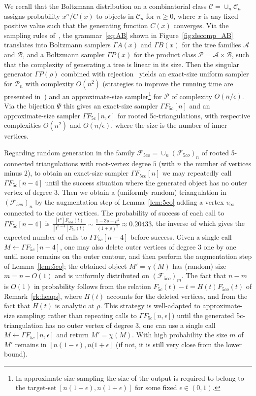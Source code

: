 \documentclass[letter]{amsart}
\numberwithin{theo}{section}
\theoremstyle{remark}
\def\cA{\mathcal{A}}
\def\cB{\mathcal{B}}
\def\cC{\mathcal{C}}
\def\cP{\mathcal{P}}
\def\cF{\mathcal{F}}
\def\Ffc{F_{5c}}
\def\Ffco{F_{5co}}
\def\cFco{\cF_{5co}}
\begin{document}
We recall that the Boltzmann distribution on a combinatorial class $\cC=\cup_n\cC_n$ assigns probability $x^n/C(x)$ to objects in $\cC_n$ for $n\geq 0$, where $x$ is any fixed positive value such that the generating function $C(x)$ converges. 
Via the sampling rules of~\cite{DuchonFLS04},
 the grammar~\eqref{eq:AB} shown in Figure~\ref{fig:decomp_AB} translates into 
Boltzmann samplers $\Gamma A(x)$ and $\Gamma B(x)$ for the tree families $\cA$ and $\cB$, and a Boltzmann sampler $\Gamma P(x)$ for the product class $\cP=\cA\times\cB$, such that the complexity of generating a tree is linear in its size. 
Then the singular generator $\Gamma P(\rho)$ combined with rejection~\cite[Sec.7.2]{DuchonFLS04} yields an exact-size uniform sampler for $\cP_n$ with complexity $O(n^2)$ (strategies to improve the running time are presented in~\cite{Spo21}) and an approximate-size sampler\footnote{In approximate-size sampling the size of the output is required to belong to the target-set $[n(1-\epsilon),n(1+\epsilon)]$ for some fixed $\epsilon\in(0,1)$.} for $\cP$  of complexity $O(n/\epsilon)$. 
Via the bijection $\Psi$ this gives an exact-size sampler $\Gamma F_{5c}[n]$ and an  approximate-size sampler $\Gamma F_{5c}[n,\epsilon]$ for rooted 5c-triangulations, 
with respective complexities $O(n^2)$ and $O(n/\epsilon)$, where the size is the number of inner vertices. 


Regarding random generation in the family $\cFco=\cup_n(\cFco)_n$ of rooted 5-connected triangulations with root-vertex degree $5$ (with $n$ the number of vertices minus $2$),  
to obtain an exact-size sampler $\Gamma F_{5co}[n]$ we may repeatedly call $\Gamma F_{5c}[n-4]$ until the success situation where the generated object has no outer vertex of degree $3$. Then we obtain a (uniformly random) triangulation in $(\cFco)_n$ 
by the augmentation step of Lemma~\ref{lem:5co} adding a vertex $v_{\infty}$ connected to the outer vertices. The probability of success of each call to $\Gamma F_{5c}[n-4]$ is 
$\frac{[t^{n}]\Ffco(t)}{[t^{n-4}]\Ffc(t)}\sim \frac{1-3\rho+\rho^2}{(1+\rho)^2}\approx 0.20433$, the inverse of which gives the expected number of calls to $\Gamma F_{5c}[n-4]$ before success. Given a single call $M\leftarrow\Gamma F_{5c}[n-4]$, one may also  delete outer vertices of degree $3$ one by one until none remains on the outer contour, and then perform the augmentation step of Lemma~\ref{lem:5co}; the obtained object $M'=\chi(M)$ has (random) size $m=n-O(1)$ and is uniformly distributed on $(\cFco)_m$. 
 The fact that $n-m$ is $O(1)$ in probability follows from the relation $\Ffc(t)-t=H(t)\Ffco(t)$ of Remark~\ref{rk:heaps}, where $H(t)$ accounts for the deleted vertices, and from the fact that $H(t)$ is analytic at $\rho$. %
 This strategy is well-adapted to approximate-size sampling: rather than repeating calls to $\Gamma \Ffc[n,\epsilon])$ until the generated 5c-triangulation has no outer vertex of degree $3$, one can use a single call $M\leftarrow\Gamma \Ffc[n,\epsilon]$ and return $M'=\chi(M)$. With high probability the size $m$ of $M'$ remains in $[n(1-\epsilon),n(1+\epsilon]$ (if not, it is still very close from the lower bound). 
\end{document}
